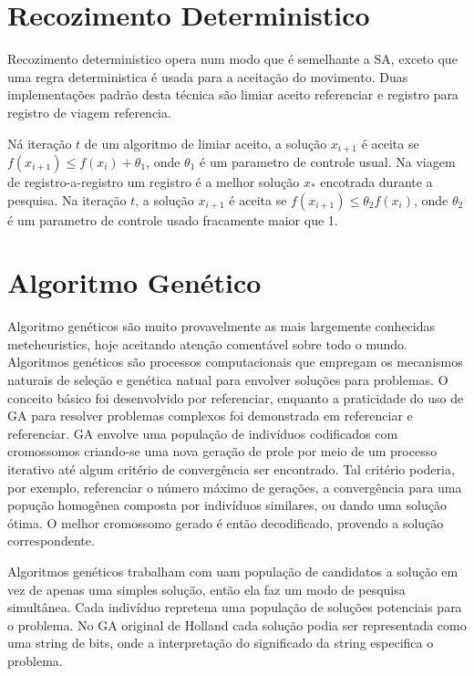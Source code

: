 \section{Recozimento Deterministico}

 Recozimento deterministico opera num modo que é semelhante a SA, exceto que uma regra
deterministica é usada para a aceitação do movimento. Duas implementações padrão desta técnica são
limiar aceito {\color{red} referenciar} e registro para registro de viagem {\color{red} referencia}.

 Ná iteração $t$ de um algoritmo de limiar aceito, a solução $x_{i+1}$ é aceita se $f(x_{i+1}) \leq
f(x_i)+\theta_1$, onde $\theta_1$ é um parametro de controle usual. Na viagem de registro-a-registro
um registro é a melhor solução $x_*$ encotrada durante a pesquisa. Na iteração $t$, a solução
$x_{i+1}$ é aceita se $f(x_{i+1}) \leq \theta_2 f(x_i)$, onde $\theta_2$ é um parametro de controle
usado fracamente maior que 1.

\section{Algoritmo Genético}

 Algoritmo genéticos são muito provavelmente as mais largemente conhecidas meteheuristics, hoje
aceitando atenção comentável sobre todo o mundo. Algoritmos genéticos são processos computacionais
que empregam os mecanismos naturais de seleção e genética natual para envolver soluções para
problemas. O conceito básico foi desenvolvido por {\color{red} referenciar}, enquanto a praticidade
do uso de GA para resolver problemas complexos foi demonstrada em {\color{red} referenciar} e
{\color{red} referenciar}. GA envolve uma população de indivíduos codificados com cromossomos
criando-se uma nova geração de prole por meio de um processo iterativo até algum critério de
convergência ser encontrado. Tal critério poderia, por exemplo, referenciar o número máximo de
gerações, a convergência para uma popução homogênea composta por indivíduos similares, ou dando uma
solução ótima. O melhor cromossomo gerado é então decodificado, provendo a solução correspondente.

 Algoritmos genéticos trabalham com uam população de candidatos a solução em vez de apenas uma
simples solução, então ela faz um modo de pesquisa simultânea. Cada indivíduo repretena uma
população de soluções potenciais para o problema. No GA original de Holland cada solução podia ser
representada como uma string de bits, onde a interpretação do significado da string especifica o
problema.

